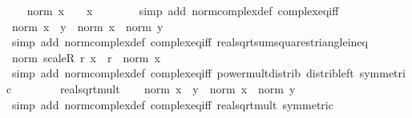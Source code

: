 \begin{isabellebody}
\ \ \isamarkupfalse%
\ {\isachardoublequoteopen}{\isacharparenleft}{\kern0pt}norm\ x\ {\isacharequal}{\kern0pt}\ {}{\isacharparenright}{\kern0pt}\ {\isacharequal}{\kern0pt}\ {\isacharparenleft}{\kern0pt}x\ {\isacharequal}{\kern0pt}\ {}{\isacharparenright}{\kern0pt}{\isachardoublequoteclose}\isanewline
\ \ \ \ \isamarkupfalse%
\ {\isacharparenleft}{\kern0pt}simp\ add{\isacharcolon}{\kern0pt}\ norm{\isacharunderscore}{\kern0pt}complex{\isacharunderscore}{\kern0pt}def\ complex{\isacharunderscore}{\kern0pt}eq{\isacharunderscore}{\kern0pt}iff{\isacharparenright}{\kern0pt}\isanewline
\ \ \isamarkupfalse%
\ {\isachardoublequoteopen}norm\ {\isacharparenleft}{\kern0pt}x\ {\isacharplus}{\kern0pt}\ y{\isacharparenright}{\kern0pt}\ {\isasymle}\ norm\ x\ {\isacharplus}{\kern0pt}\ norm\ y{\isachardoublequoteclose}\isanewline
\ \ \ \ \isamarkupfalse%
\ {\isacharparenleft}{\kern0pt}simp\ add{\isacharcolon}{\kern0pt}\ norm{\isacharunderscore}{\kern0pt}complex{\isacharunderscore}{\kern0pt}def\ complex{\isacharunderscore}{\kern0pt}eq{\isacharunderscore}{\kern0pt}iff\ real{\isacharunderscore}{\kern0pt}sqrt{\isacharunderscore}{\kern0pt}sum{\isacharunderscore}{\kern0pt}squares{\isacharunderscore}{\kern0pt}triangle{\isacharunderscore}{\kern0pt}ineq{\isacharparenright}{\kern0pt}\isanewline
\ \ \isamarkupfalse%
\ {\isachardoublequoteopen}norm\ {\isacharparenleft}{\kern0pt}scaleR\ r\ x{\isacharparenright}{\kern0pt}\ {\isacharequal}{\kern0pt}\ {\isasymbar}r{\isasymbar}\ {\isacharasterisk}{\kern0pt}\ norm\ x{\isachardoublequoteclose}\isanewline
\ \ \ \ \isamarkupfalse%
\ {\isacharparenleft}{\kern0pt}simp\ add{\isacharcolon}{\kern0pt}\ norm{\isacharunderscore}{\kern0pt}complex{\isacharunderscore}{\kern0pt}def\ complex{\isacharunderscore}{\kern0pt}eq{\isacharunderscore}{\kern0pt}iff\ power{\isacharunderscore}{\kern0pt}mult{\isacharunderscore}{\kern0pt}distrib\ distrib{\isacharunderscore}{\kern0pt}left\ {\isacharbrackleft}{\kern0pt}symmetric{\isacharbrackright}{\kern0pt}\isanewline
\ \ \ \ \ \ \ \ real{\isacharunderscore}{\kern0pt}sqrt{\isacharunderscore}{\kern0pt}mult{\isacharparenright}{\kern0pt}\isanewline
\ \ \isamarkupfalse%
\ {\isachardoublequoteopen}norm\ {\isacharparenleft}{\kern0pt}x\ {\isacharasterisk}{\kern0pt}\ y{\isacharparenright}{\kern0pt}\ {\isacharequal}{\kern0pt}\ norm\ x\ {\isacharasterisk}{\kern0pt}\ norm\ y{\isachardoublequoteclose}\isanewline
\ \ \ \ \isamarkupfalse%
\ {\isacharparenleft}{\kern0pt}simp\ add{\isacharcolon}{\kern0pt}\ norm{\isacharunderscore}{\kern0pt}complex{\isacharunderscore}{\kern0pt}def\ complex{\isacharunderscore}{\kern0pt}eq{\isacharunderscore}{\kern0pt}iff\ real{\isacharunderscore}{\kern0pt}sqrt{\isacharunderscore}{\kern0pt}mult\ {\isacharbrackleft}{\kern0pt}symmetric{\isacharbrackright}{\kern0pt}\isanewline

\end{isabellebody}
